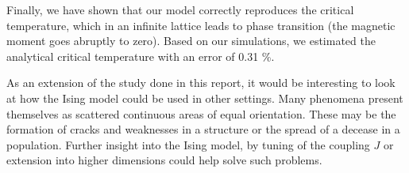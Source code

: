 \documentclass[]{article}
\begin{document}
Finally, we have shown that our model correctly reproduces the critical temperature, which in an infinite lattice leads to phase transition (the magnetic moment goes abruptly to zero). Based on our simulations, we estimated the analytical critical temperature with an error of 0.31  \%.

\vspace{5mm}

As an extension of the study done in this report, it would be interesting to look at how the Ising model could be used in other settings. Many phenomena present themselves as scattered continuous areas of equal orientation. These may be the formation of cracks and weaknesses in a structure or the spread of a decease in a population. Further insight into the Ising model, by tuning of the coupling $J$ or extension into higher dimensions could help solve such problems.



\end{document}
